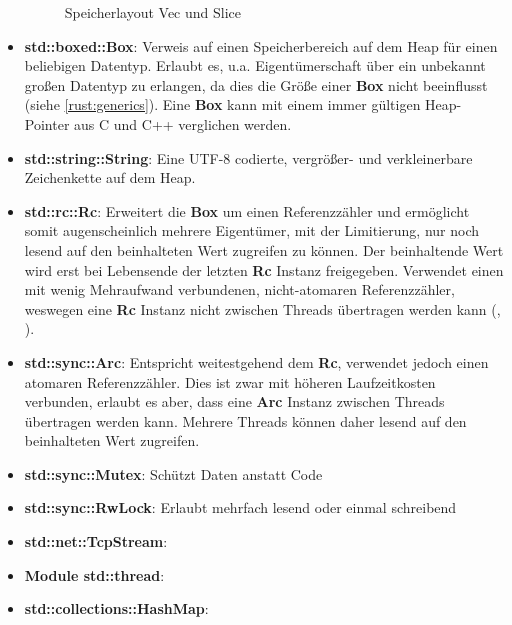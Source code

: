 \begin{itemize}
\begin{figure}[H]
		\caption{Speicherlayout Vec und Slice \cite[63]{rust:orly_programming}}
		\label{rust:memory_layout:vec_slice}
	\end{figure}
	
	\item \textbf{std::boxed::Box}:
	Verweis auf einen Speicherbereich auf dem Heap für einen beliebigen Datentyp.
	Erlaubt es, u.a. Eigentümerschaft über ein unbekannt großen Datentyp zu erlangen, da dies die Größe einer \textbf{Box} nicht beeinflusst (siehe \autoref{rust:generics}).
	Eine \textbf{Box} kann mit einem immer gültigen Heap-Pointer aus C und C++ verglichen werden.
	
	\item \textbf{std::string::String}: Eine UTF-8 codierte, vergrößer- und verkleinerbare Zeichenkette auf dem Heap.
	
	\item \textbf{std::rc::Rc}: Erweitert die \textbf{Box} um einen Referenzzähler und ermöglicht somit augenscheinlich mehrere Eigentümer, mit der Limitierung, nur noch lesend auf den beinhalteten Wert zugreifen zu können.
	Der beinhaltende Wert wird erst bei Lebensende der letzten \textbf{Rc} Instanz freigegeben.
	Verwendet einen mit wenig Mehraufwand verbundenen, nicht-atomaren Referenzzähler, weswegen eine \textbf{Rc} Instanz nicht zwischen Threads übertragen werden kann (, ).
	
	\item \textbf{std::sync::Arc}: Entspricht weitestgehend dem \textbf{Rc}, verwendet jedoch einen atomaren Referenzzähler.
	Dies ist zwar mit höheren Laufzeitkosten verbunden, erlaubt es aber, dass eine \textbf{Arc} Instanz zwischen Threads übertragen werden kann.
	Mehrere Threads können daher lesend auf den beinhalteten Wert zugreifen.
	
	\item \textbf{std::sync::Mutex}:  Schützt Daten anstatt Code
	\item \textbf{std::sync::RwLock}:  Erlaubt mehrfach lesend oder einmal schreibend
	\item \textbf{std::net::TcpStream}:  
	\item \textbf{Module std::thread}: 
	\item \textbf{std::collections::HashMap}: 
	
\end{itemize}


